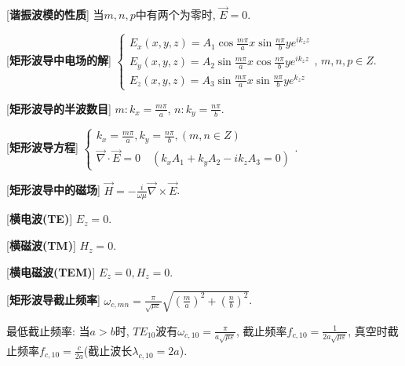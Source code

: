 [\textbf{谐振波模的性质}] 当$m,n,p$中有两个为零时, $\vec E=0$.\par

[\textbf{矩形波导中电场的解}] $\begin{cases}E_x(x,y,z)=A_1\cos{\frac{m\pi}{a}x}\sin{\frac{n\pi}{b}y}e^{ik_zz}\\E_y(x,y,z)=A_2\sin{\frac{m\pi}{a}x}\cos{\frac{n\pi}{b}y}e^{ik_zz}\\E_z(x,y,z)=A_3\sin{\frac{m\pi}{a}x}\sin{\frac{n\pi}{b}y}e^{k_zz}\end{cases}$, $m,n,p\in Z$.\par

[\textbf{矩形波导的半波数目}] $m:k_x=\frac{m\pi}{a}$, $n:k_y=\frac{n\pi}{b}$.\par

[\textbf{矩形波导方程}] $\begin{cases}k_x=\frac{m\pi}{a}, k_y=\frac{n\pi}{b}, (m,n\in Z)\\\vec\nabla\cdot\vec E=0\quad (k_xA_1+k_yA_2-ik_zA_3=0)\end{cases}$.\par

[\textbf{矩形波导中的磁场}] $\vec H=-\frac{i}{\omega\mu}\vec\nabla\times\vec E$.\par

\clearpage

[\textbf{横电波(TE)}] $E_z=0$.\par

[\textbf{横磁波(TM)}] $H_z=0$.\par

[\textbf{横电磁波(TEM)}] $E_z=0, H_z=0$.\par

[\textbf{矩形波导截止频率}] $\omega_{c,mn}=\frac{\pi}{\sqrt{\mu\varepsilon}}\sqrt{\left(\frac{m}{a}\right)^2+\left(\frac{n}{b}\right)^2}$.\par
\qquad 最低截止频率: 当$a>b$时, $TE_{10}$波有$\omega_{c,10}=\frac{\pi}{a\sqrt{\mu\varepsilon}}$, 截止频率$f_{c,10}=\frac{1}{2a\sqrt{\mu\varepsilon}}$, 真空时截止频率$f_{c,10}=\frac{c}{2a}$(截止波长$\lambda_{c,10}=2a$).\par


